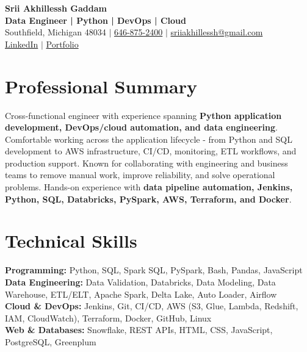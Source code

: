 \documentclass[letterpaper,10pt]{article}
\begin{document}
\fontsize{9.35pt}{10.45pt}\selectfont

\begin{center}
    {\LARGE \textbf{Srii Akhillessh Gaddam}} \\[-1pt]
    \textbf{Data Engineer | Python | DevOps | Cloud} \\[2pt]
    Southfield, Michigan 48034 $|$
    \href{tel:6468752400}{646-875-2400} $|$
    \href{mailto:sriiakhillessh@gmail.com}{sriiakhillessh@gmail.com} \\[1pt]
    \href{https://www.linkedin.com/in/srii-akhiilessh-gaddam-b48668191/}{LinkedIn} $|$
    \href{https://sriiakhillesshg.github.io/portfolio/}{Portfolio}
\end{center}
\vspace{-8pt}

\section{Professional Summary}
\small{Cross-functional engineer with experience spanning \textbf{Python application development, DevOps/cloud automation, and data engineering}. Comfortable working across the application lifecycle - from Python and SQL development to AWS infrastructure, CI/CD, monitoring, ETL workflows, and production support. Known for collaborating with engineering and business teams to remove manual work, improve reliability, and solve operational problems. Hands-on experience with \textbf{data pipeline automation, Jenkins, Python, SQL, Databricks, PySpark, AWS, Terraform, and Docker}.}

\section{Technical Skills}
\small{
\textbf{Programming:} Python, SQL, Spark SQL, PySpark, Bash, Pandas, JavaScript \\
\textbf{Data Engineering:} Data Validation, Databricks, Data Modeling, Data Warehouse, ETL/ELT, Apache Spark, Delta Lake, Auto Loader, Airflow \\
\textbf{Cloud \& DevOps:} Jenkins, Git, CI/CD, AWS (S3, Glue, Lambda, Redshift, IAM, CloudWatch), Terraform, Docker, GitHub, Linux \\
\textbf{Web \& Databases:} Snowflake, REST APIs, HTML, CSS, JavaScript, PostgreSQL, Greenplum
}
\end{document}
